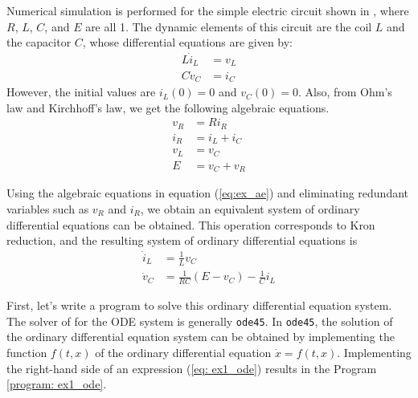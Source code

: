 \documentclass[tombow,dvipdfmx]{corona-a5-1.1}
\begin{document}
\begin{例}\label{ex:dae_ex1}
Numerical simulation is performed for the simple electric circuit shown in , where $R$, $L$, $C$, and $E$ are all 1.
The dynamic elements of this circuit are the coil $L$ and the capacitor $C$, whose differential equations are given by:
\begin{subequations}\label{eq:ex_de}
  \begin{align}
    L\dot i_L & = v_L \\
    C\dot v_C & = i_C
  \end{align}
\end{subequations}
However, the initial values are $i_L(0)=0$ and $v_C(0)=0$.
Also, from Ohm's law and Kirchhoff's law, we get the following algebraic equations.
\begin{subequations}\label{eq:ex_ae}
  \begin{align}
    v_R & =R i_R      \\
    i_R & = i_L + i_C \\
    v_L & = v_C       \\
    E   & = v_C + v_R
  \end{align}
\end{subequations}

Using the algebraic equations in equation (\ref{eq:ex_ae}) and eliminating redundant variables such as $v_R$ and $i_R$, we obtain an equivalent system of ordinary differential equations can be obtained.
This operation corresponds to Kron reduction, and the resulting system of ordinary differential equations is
\begin{subequations}\label{eq:ex1_ode}
  \begin{align}
    \dot{i}_L & = \frac{1}{L}v_C                     \\
    \dot{v}_C & = \frac{1}{RC}(E-v_C)-\frac{1}{C}i_L
  \end{align}
\end{subequations}

First, let's write a program to solve this ordinary differential equation system.
The solver of \matlab for the ODE system is generally \verb|ode45|.
In \verb|ode45|, the solution of the ordinary differential equation system can be obtained by implementing the function $f(t,x)$ of the ordinary differential equation $\dot{x} = f(t,x) $.
Implementing the right-hand side of an expression (\ref{eq: ex1_ode}) results in the Program \ref{program: ex1_ode}.


\end{例}
\end{document}

